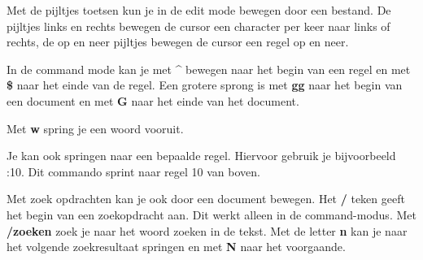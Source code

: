 Met de pijltjes toetsen kun je in de edit mode bewegen door een bestand. De pijltjes links en rechts bewegen de cursor een character per keer naar links of rechts, de op en neer pijltjes bewegen de cursor een regel op en neer.

In de command mode kan je met \textbf{\^} bewegen naar het begin van een regel en met \textbf{\$} naar het einde van de regel. Een grotere sprong is met \textbf{gg} naar het begin van een document en met \textbf{G} naar het einde van het document.

Met \textbf{w} spring je een woord vooruit.

Je kan ook springen naar een bepaalde regel. Hiervoor gebruik je bijvoorbeeld :10. Dit commando sprint naar regel 10 van boven.

Met zoek opdrachten kan je ook door een document bewegen. Het \textbf{/} teken geeft het begin van een zoekopdracht aan. Dit werkt alleen in de command-modus. Met \textbf{/zoeken} zoek je naar het woord zoeken in de tekst. Met de letter \textbf{n} kan je naar het volgende zoekresultaat springen en met \textbf{N} naar het voorgaande.
